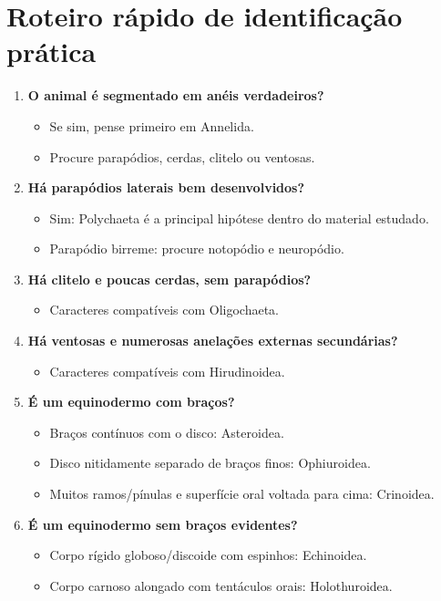 \documentclass[a4paper,12pt]{article}
\begin{document}
\section{Roteiro rápido de identificação prática}

\begin{enumerate}
  \item \textbf{O animal é segmentado em anéis verdadeiros?}
  \begin{itemize}
    \item Se sim, pense primeiro em Annelida.
    \item Procure parapódios, cerdas, clitelo ou ventosas.
  \end{itemize}

  \item \textbf{Há parapódios laterais bem desenvolvidos?}
  \begin{itemize}
    \item Sim: Polychaeta é a principal hipótese dentro do material estudado.
    \item Parapódio birreme: procure notopódio e neuropódio.
  \end{itemize}

  \item \textbf{Há clitelo e poucas cerdas, sem parapódios?}
  \begin{itemize}
    \item Caracteres compatíveis com Oligochaeta.
  \end{itemize}

  \item \textbf{Há ventosas e numerosas anelações externas secundárias?}
  \begin{itemize}
    \item Caracteres compatíveis com Hirudinoidea.
  \end{itemize}

  \item \textbf{É um equinodermo com braços?}
  \begin{itemize}
    \item Braços contínuos com o disco: Asteroidea.
    \item Disco nitidamente separado de braços finos: Ophiuroidea.
    \item Muitos ramos/pínulas e superfície oral voltada para cima: Crinoidea.
  \end{itemize}

  \item \textbf{É um equinodermo sem braços evidentes?}
  \begin{itemize}
    \item Corpo rígido globoso/discoide com espinhos: Echinoidea.
    \item Corpo carnoso alongado com tentáculos orais: Holothuroidea.
  \end{itemize}
\end{enumerate}
\end{document}
